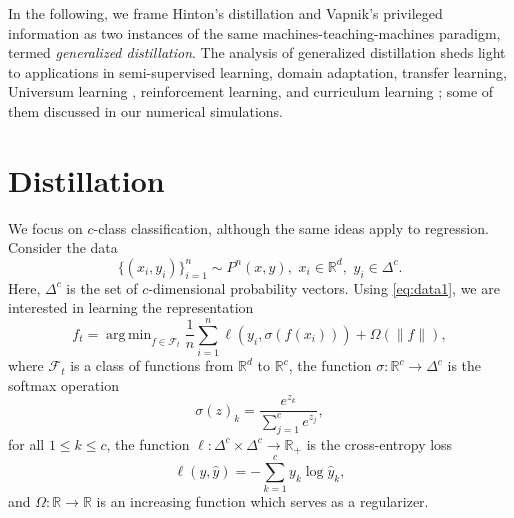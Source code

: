 \documentclass{article}
\DeclareMathOperator*{\argmin}{arg\,min}
\newcommand{\softmax}{\sigma}
\begin{document}
In the following, we frame Hinton's distillation and Vapnik's privileged
information as two instances of the same machines-teaching-machines paradigm,
termed \emph{generalized distillation}. The analysis of generalized
distillation sheds light to applications in semi-supervised learning,
domain adaptation, transfer learning, Universum learning \citep{Weston06},
reinforcement learning, and curriculum learning \citep{bengio2009curriculum};
some of them discussed in our numerical simulations.

\section{Distillation}\label{sec:distillation}
  We focus on $c$-class classification, although the same ideas apply to
  regression. Consider the data
  \begin{equation}
  \label{eq:data1}
    \{(x_i, y_i)\}_{i=1}^n \sim P^n(x,y), \,\, x_i \in \mathbb{R}^d, \,\, y_i
  \in \Delta^c.
  \end{equation}
  Here, $\Delta^c$ is the set of $c$-dimensional probability vectors.  Using
  \eqref{eq:data1}, we are interested in learning the representation 
  \begin{equation}\label{eq:obj1}
    f_t = \argmin_{f \in \mathcal{F}_t} \frac{1}{n} \sum_{i=1}^n \ell(y_i, \softmax(f(x_i))) + \Omega(\|f\|),
  \end{equation}
  where $\mathcal{F}_t$ is a class of functions from $\mathbb{R}^d$ to
  $\mathbb{R}^c$, the function $\softmax : \mathbb{R}^c \to \Delta^c$ is the
  softmax operation
  \begin{equation*}
  \softmax(z)_k = \frac{e^{z_k}}{\sum_{j=1}^c e^{z_j}},
  \end{equation*}
  for all $1 \leq k \leq c$, the function $\ell : \Delta^c \times \Delta^c \to \mathbb{R}_+$
    is the cross-entropy loss
  \begin{equation*}
    \ell(y,\hat{y}) = -\sum_{k=1}^c y_k \log \hat{y}_k,
  \end{equation*}
  and $\Omega : \mathbb{R} \to \mathbb{R}$ is an increasing function which serves as a regularizer.
\end{document}
